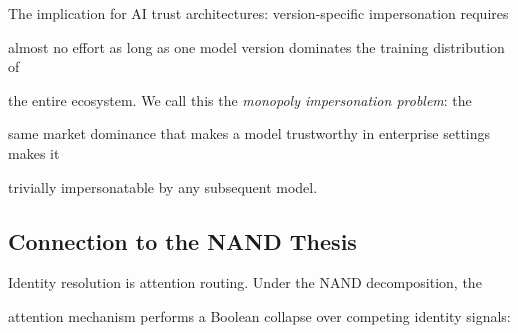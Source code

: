 The implication for AI trust architectures: version-specific impersonation requires





almost no effort as long as one model version dominates the training distribution of





the entire ecosystem. We call this the \emph{monopoly impersonation problem}: the





same market dominance that makes a model trustworthy in enterprise settings makes it





trivially impersonatable by any subsequent model.











\subsection{Connection to the NAND Thesis}











Identity resolution is attention routing. Under the NAND decomposition, the





attention mechanism performs a Boolean collapse over competing identity signals:











